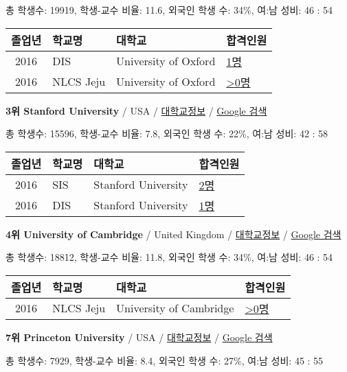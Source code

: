 \documentclass[13pt,]{article}
\begin{document}
총 학생수: 19919, 학생-교수 비율: 11.6, 외국인 학생 수: 34\%, 여:남
성비: 46 : 54

\begin{longtable}[]{@{}clll@{}}
\toprule
졸업년 & 학교명 & 대학교 & 합격인원\tabularnewline
\midrule
\endhead
2016 & DIS & University of Oxford &
\href{http://cafe.naver.com/assarabia/11591}{1명}\tabularnewline
2016 & NLCS Jeju & University of Oxford &
\href{http://cafe.naver.com/assarabia/11592}{\textgreater{}0명}\tabularnewline
\bottomrule
\end{longtable}

\textbf{3위 Stanford University} / USA /
\href{https://www.timeshighereducation.com/world-university-rankings/stanford-university?ranking-dataset=133819}{대학교정보}
/ \href{http://www.google.com/search?q=Stanford+University}{Google 검색}

총 학생수: 15596, 학생-교수 비율: 7.8, 외국인 학생 수: 22\%, 여:남 성비:
42 : 58

\begin{longtable}[]{@{}clll@{}}
\toprule
졸업년 & 학교명 & 대학교 & 합격인원\tabularnewline
\midrule
\endhead
2016 & SIS & Stanford University &
\href{http://cafe.naver.com/assarabia/11589}{2명}\tabularnewline
2016 & DIS & Stanford University &
\href{http://cafe.naver.com/assarabia/11591}{1명}\tabularnewline
\bottomrule
\end{longtable}

\textbf{4위 University of Cambridge} / United Kingdom /
\href{https://www.timeshighereducation.com/world-university-rankings/university-of-cambridge?ranking-dataset=133819}{대학교정보}
/ \href{http://www.google.com/search?q=University+of+Cambridge}{Google
검색}

총 학생수: 18812, 학생-교수 비율: 11.8, 외국인 학생 수: 34\%, 여:남
성비: 46 : 54

\begin{longtable}[]{@{}clll@{}}
\toprule
졸업년 & 학교명 & 대학교 & 합격인원\tabularnewline
\midrule
\endhead
2016 & NLCS Jeju & University of Cambridge &
\href{http://cafe.naver.com/assarabia/11592}{\textgreater{}0명}\tabularnewline
\bottomrule
\end{longtable}

\textbf{7위 Princeton University} / USA /
\href{https://www.timeshighereducation.com/world-university-rankings/princeton-university?ranking-dataset=133819}{대학교정보}
/ \href{http://www.google.com/search?q=Princeton+University}{Google
검색}

총 학생수: 7929, 학생-교수 비율: 8.4, 외국인 학생 수: 27\%, 여:남 성비:
45 : 55
\end{document}
